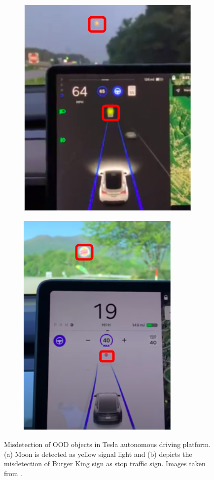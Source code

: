\begin{figure}[h!]
    \begin{subfigure}{0.48\textwidth}
        \centering
        \includegraphics[scale=0.5]{images/tesla_1.png}
        \caption{}
        \label{fig:teslafails_1}
    \end{subfigure}
    \begin{subfigure}{0.48\textwidth}
        \centering
        \includegraphics[scale=0.5]{images/tesla_2.png}
        \caption{}
        \label{fig:teslafails_2}
    \end{subfigure}
    \caption{Misdetection of OOD objects in Tesla autonomous driving platform. (a) Moon is detected as yellow signal light and (b) depicts the misdetection of Burger King sign as stop traffic sign. Images taken from \cite{tesla_fails}.}
\end{figure}

